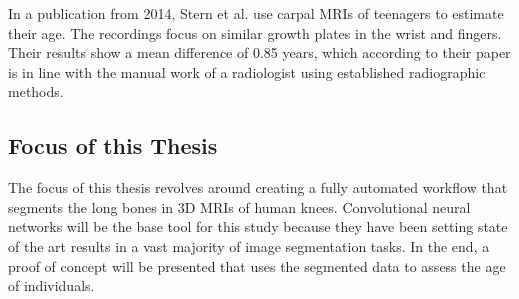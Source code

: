 In a publication from 2014, Stern et al. use carpal MRIs of teenagers to estimate their age. The recordings focus on similar growth plates in the wrist and fingers. Their results show a mean difference of 0.85 years, which according to their paper is in line with the manual work of a radiologist using established radiographic methods.

\subsection{Focus of this Thesis}

The focus of this thesis revolves around creating a fully automated workflow that segments the long bones in 3D MRIs of human knees. Convolutional neural networks will be the base tool for this study because they have been setting state of the art results in a vast majority of image segmentation tasks. In the end, a proof of concept will be presented that uses the segmented data to assess the age of individuals.

\newpage

